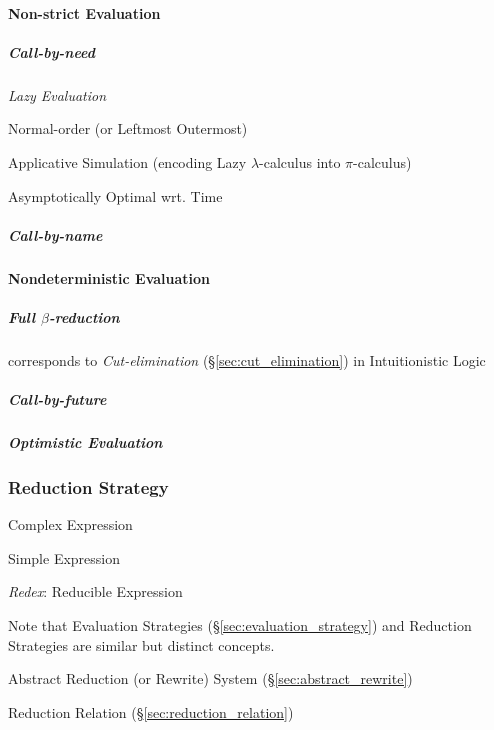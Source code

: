 \paragraph{Non-strict Evaluation}\label{sec:nonstrict_evaluation}\hfill

\subparagraph{Call-by-need}\label{sec:call_by_need}\hfill

\emph{Lazy Evaluation}

Normal-order (or Leftmost Outermost)

Applicative Simulation (encoding Lazy $\lambda$-calculus into
$\pi$-calculus) \cite{milner92}

Asymptotically Optimal wrt. Time %



\subparagraph{Call-by-name}\label{sec:call_by_name}\hfill



\paragraph{Nondeterministic Evaluation}\hfill
\label{sec:nondeterministic_evaluation}



\subparagraph{Full $\beta$-reduction}\label{sec:full_beta_reduction}\hfill

corresponds to \emph{Cut-elimination} (\S\ref{sec:cut_elimination}) in
Intuitionistic Logic



\subparagraph{Call-by-future}\label{sec:call_by_future}\hfill

\subparagraph{Optimistic Evaluation}\label{sec:optimistic_evaluation}\hfill



\subsubsection{Reduction Strategy}\label{sec:reduction_strategy}

Complex Expression

Simple Expression

\emph{Redex}: Reducible Expression

\fist Note that Evaluation Strategies
(\S\ref{sec:evaluation_strategy}) and Reduction Strategies are similar
but distinct concepts.

Abstract Reduction (or Rewrite) System (\S\ref{sec:abstract_rewrite})

Reduction Relation (\S\ref{sec:reduction_relation})

